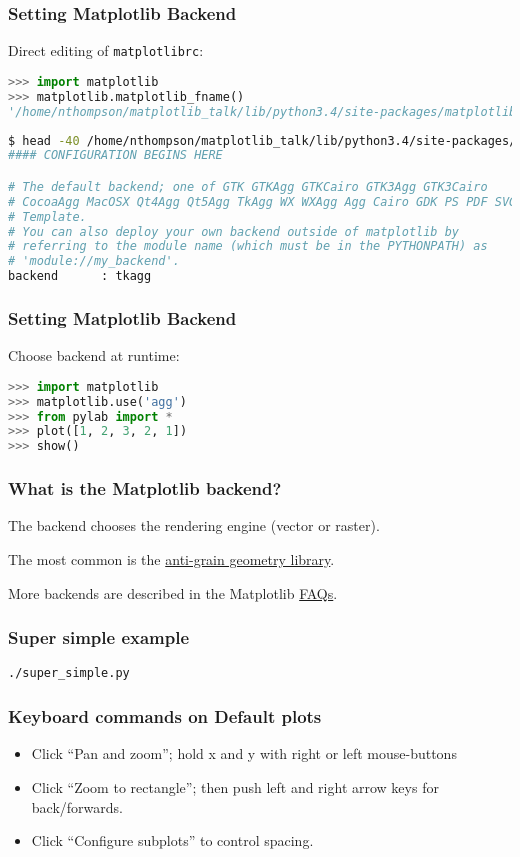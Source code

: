 \documentclass{beamer}
\begin{document}
\begin{frame}[fragile]
\frametitle{Setting Matplotlib Backend}
Direct editing of \texttt{matplotlibrc}:
\begin{lstlisting}[language=Python]
>>> import matplotlib
>>> matplotlib.matplotlib_fname()
'/home/nthompson/matplotlib_talk/lib/python3.4/site-packages/matplotlib/mpl-data/matplotlibrc'
\end{lstlisting}
\begin{lstlisting}[language=bash]
$ head -40 /home/nthompson/matplotlib_talk/lib/python3.4/site-packages/matplotlib/mpl-data/matplotlibrc
#### CONFIGURATION BEGINS HERE

# The default backend; one of GTK GTKAgg GTKCairo GTK3Agg GTK3Cairo
# CocoaAgg MacOSX Qt4Agg Qt5Agg TkAgg WX WXAgg Agg Cairo GDK PS PDF SVG
# Template.
# You can also deploy your own backend outside of matplotlib by
# referring to the module name (which must be in the PYTHONPATH) as
# 'module://my_backend'.
backend      : tkagg
\end{lstlisting}
\end{frame}

\begin{frame}[fragile]
\frametitle{Setting Matplotlib Backend}
Choose backend at runtime:
\begin{lstlisting}[language=Python]
>>> import matplotlib
>>> matplotlib.use('agg')
>>> from pylab import *
>>> plot([1, 2, 3, 2, 1])
>>> show()
\end{lstlisting}
\end{frame}

\begin{frame}
\frametitle{What is the Matplotlib backend?}
The backend chooses the rendering engine (vector or raster).

The most common is the \href{http://agg.sourceforge.net/antigrain.com/index.html}{anti-grain geometry library}.

More backends are described in the Matplotlib \href{http://matplotlib.org/faq/usage_faq.html}{FAQs}.

\end{frame}

\begin{frame}
\frametitle{Super simple example}

\texttt{./super\_simple.py}

\end{frame}

\begin{frame}
\frametitle{Keyboard commands on Default plots}

\begin{itemize}

\item Click ``Pan and zoom''; hold x and y with right or left mouse-buttons
\item Click ``Zoom to rectangle''; then push left and right arrow keys for back/forwards.
\item Click ``Configure subplots'' to control spacing.

\end{itemize}

\end{frame}
\end{document}
